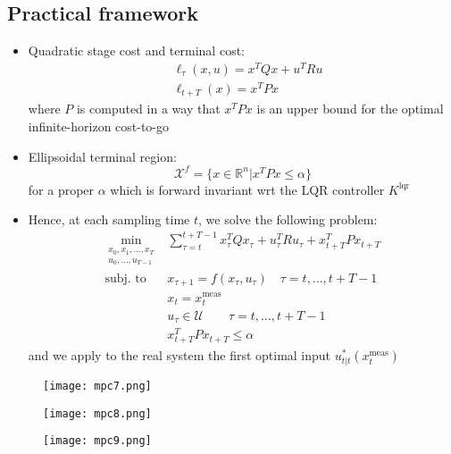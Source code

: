\documentclass[openany]{book}
\newcommand{\R}{\mathbb{R}}               %
\theoremstyle{definition}
\theoremstyle{remark}
\begin{document}
\subsection{Practical framework}
\begin{itemize}
    \item Quadratic stage cost and terminal cost: 
        \begin{align*}
            &\ell_\tau(x,u)=x^TQx+u^TRu\\
            &\ell_{t+T}(x) = x^TPx
        \end{align*}
        where $P$ is computed in a way that $x^TPx$ is an upper bound for the optimal infinite-horizon cost-to-go
    \item Ellipsoidal terminal region: 
        \[
            \mathcal{X}^f = \{x\in\R^n|x^TPx\leq\alpha\}
        \]
        for a proper $\alpha$ which is forward invariant wrt the LQR controller $K^{\text{lqr}}$
    \item Hence, at each sampling time $t$, we solve the following problem: 
        \begin{align*}
            \min_{\substack{x_0,x_1,\dots,x_T\\u_0,\dots,u_{T-1}}} & \displaystyle\sum_{\tau=t}^{t+T-1}x_\tau^TQx_\tau + u_\tau^TRu_\tau + x_{t+T}^TPx_{t+T}\\
            \text{subj.\ to } & x_{\tau+1}=f(x_\tau,u_\tau) \quad \tau=t,\dots,t+T-1\\
            & x_t = x_t^{\text{meas}} \\
            & u_\tau \in \mathcal{U} \qquad \tau=t,\dots,t+T-1\\ 
            & x_{t+T}^TPx_{t+T}\leq \alpha
        \end{align*}
        and we apply to the real system the first optimal input $u^*_{t|t}(x_t^{\text{meas}})$
\end{itemize}

\begin{figure}[ht]
    \centering
    \begin{minipage}{0.32\textwidth}
        \centering
        \texttt{[image: mpc7.png]}
        \label{fig:mpc7}
    \end{minipage}
    \hfill
    \begin{minipage}{0.32\textwidth}
        \centering
        \texttt{[image: mpc8.png]}
        \label{fig:mpc8}
    \end{minipage}
    \hfill
    \begin{minipage}{0.32\textwidth}
        \centering
        \texttt{[image: mpc9.png]}
        \label{fig:mpc9}
    \end{minipage}
\end{figure}
\end{document}

